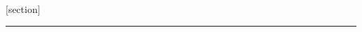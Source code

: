[section]

\newenvironment{fibelurl}
{\refstepcounter{fibelurlctr}[\arabic{fibelurlctr}]~}
{\par}

\newcommand{\pullquotenl}{\par~}


\newlength{\temp}

{\vspace{-0.6cm}%
%
\rule[2.6mm]{0.96\linewidth}{0.5mm}%
}

\newcommand{\fibelmargin}{\Large Ersti-$\Phi$bel \fibeljahr}


\renewcommand{\Re}{\operatorname{Re}}
\renewcommand{\Im}{\operatorname{Im}}

\newcommand{\arsinh}{\operatorname{arsinh}}
\newcommand{\arcosh}{\operatorname{arcosh}}
\newcommand{\artanh}{\operatorname{artanh}}

\makeatletter
\newcommand*{\diff}{\@ifnextchar^{\DIfF}{\DIfF^{}}}
\makeatother
\def\DIfF^#1{\mathop{\mathrm{\mathstrut d}}\nolimits^{#1}\gobblespace}
\def\gobblespace{\futurelet\diffarg\opspace}
\def\opspace{%
	\let\DiffSpace\!%
	\ifx\diffarg(%
		\let\DiffSpace\relax
	\else\ifx\diffarg[%
		\let\DiffSpace\relax
	\else\ifx\diffarg\{%
		\let\DiffSpace\relax
	\fi\fi\fi\DiffSpace}

\newcommand*{\pderiv}[3][]{\frac{\partial^{#1}#2}{\partial #3^{#1}}}
\newcommand*{\deriv}[3][]{\frac{\diff^{#1}#2}{\diff #3^{#1}}}


